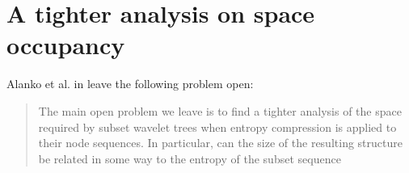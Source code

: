\clearpage
\section{A tighter analysis on space occupancy}
Alanko et al. in \cite{SubsetWT} leave the following problem open:
\begin{quote}
    The main open problem we leave is to find a tighter analysis of the space required by subset wavelet trees when entropy compression is applied to their node sequences. In particular, can the size of the resulting structure be related in some way to the entropy of the subset sequence
\end{quote}
